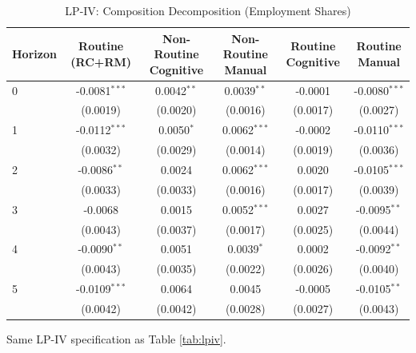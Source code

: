 \begin{table}[htbp]
\centering
\caption{LP-IV: Composition Decomposition (Employment Shares)}
\label{tab:composition}
\small
\begin{tabular}{lccccc}
\hline\hline
Horizon & Routine (RC+RM) & Non-Routine Cognitive & Non-Routine Manual & Routine Cognitive & Routine Manual \\
\hline
0 & -0.0081$^{***}$ & 0.0042$^{**}$ & 0.0039$^{**}$ & -0.0001 & -0.0080$^{***}$ \\
 & (0.0019) & (0.0020) & (0.0016) & (0.0017) & (0.0027) \\[3pt]
1 & -0.0112$^{***}$ & 0.0050$^{*}$ & 0.0062$^{***}$ & -0.0002 & -0.0110$^{***}$ \\
 & (0.0032) & (0.0029) & (0.0014) & (0.0019) & (0.0036) \\[3pt]
2 & -0.0086$^{**}$ & 0.0024 & 0.0062$^{***}$ & 0.0020 & -0.0105$^{***}$ \\
 & (0.0033) & (0.0033) & (0.0016) & (0.0017) & (0.0039) \\[3pt]
3 & -0.0068 & 0.0015 & 0.0052$^{***}$ & 0.0027 & -0.0095$^{**}$ \\
 & (0.0043) & (0.0037) & (0.0017) & (0.0025) & (0.0044) \\[3pt]
4 & -0.0090$^{**}$ & 0.0051 & 0.0039$^{*}$ & 0.0002 & -0.0092$^{**}$ \\
 & (0.0043) & (0.0035) & (0.0022) & (0.0026) & (0.0040) \\[3pt]
5 & -0.0109$^{***}$ & 0.0064 & 0.0045 & -0.0005 & -0.0105$^{**}$ \\
 & (0.0042) & (0.0042) & (0.0028) & (0.0027) & (0.0043) \\[3pt]
\hline\hline
\end{tabular}
\begin{tablenotes}\small
\item Same LP-IV specification as Table \ref{tab:lpiv}.
\end{tablenotes}
\end{table}
